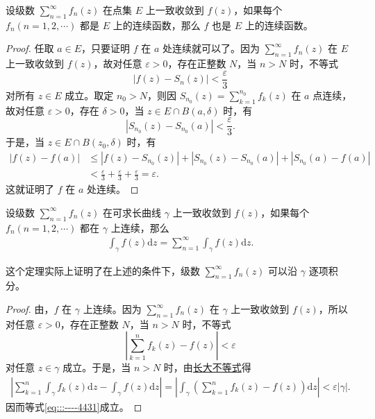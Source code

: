 \documentclass[../../main.tex]{subfiles}
\begin{document}
\begin{theorem}\label{theorem:定理4.1.4}
设级数 \( \sum_{n=1}^{\infty} f_n(z) \) 在点集 \( E \) 上一致收敛到 \( f(z) \)，如果每个 \( f_n (n = 1, 2, \cdots) \) 都是 \( E \) 上的连续函数，那么 \( f \) 也是 \( E \) 上的连续函数。
\end{theorem}
\begin{proof}
任取 \( a \in E \)，只要证明 \( f \) 在 \( a \) 处连续就可以了。因为 \( \sum_{n=1}^{\infty} f_n(z) \) 在 \( E \) 上一致收敛到 \( f(z) \)，故对任意 \( \varepsilon > 0 \)，存在正整数 \( N \)，当 \( n > N \) 时，不等式
\[
|f(z) - S_n(z)| < \frac{\varepsilon}{3}
\]
对所有 \( z \in E \) 成立。取定 \( n_0 > N \)，则因 \( S_{n_0}(z) = \sum_{k=1}^{n_0} f_k(z) \) 在 \( a \) 点连续，故对任意 \( \varepsilon > 0 \)，存在 \( \delta > 0 \)，当 \( z \in E \cap B(a, \delta) \) 时，有
\[
|S_{n_0}(z) - S_{n_0}(a)| < \frac{\varepsilon}{3}.
\]
于是，当 \( z \in E \cap B(z_0, \delta) \) 时，有
\begin{align*}
|f(z) - f(a)| &\leqslant |f(z) - S_{n_0}(z)| + |S_{n_0}(z) - S_{n_0}(a)| + |S_{n_0}(a) - f(a)| \\
&< \frac{\varepsilon}{3} + \frac{\varepsilon}{3} + \frac{\varepsilon}{3}= \varepsilon.
\end{align*}
这就证明了 \( f \) 在 \( a \) 处连续。

\end{proof}

\begin{theorem}\label{theorem:定理4.1.5}
设级数 \( \sum_{n=1}^{\infty} f_n(z) \) 在可求长曲线 \( \gamma \) 上一致收敛到 \( f(z) \)，如果每个 \( f_n (n = 1, 2, \cdots) \) 都在 \( \gamma \) 上连续，那么
\begin{align}
\int_{\gamma} f(z) \mathrm{d}z = \sum_{n=1}^{\infty} \int_{\gamma} f(z) \mathrm{d}z.\label{eq:::----4431}
\end{align}
\end{theorem}
\begin{remark}
这个定理实际上证明了在上述的条件下，级数 \( \sum_{n=1}^{\infty} f_n(z) \) 可以沿 \( \gamma \) 逐项积分。
\end{remark}
\begin{proof}
由，\( f \) 在 \( \gamma \) 上连续。因为 \( \sum_{n=1}^{\infty} f_n(z) \) 在 \( \gamma \) 上一致收敛到 \( f(z) \)，所以对任意 \( \varepsilon > 0 \)，存在正整数 \( N \)，当 \( n > N \) 时，不等式
\[
\left| \sum_{k=1}^{n} f_k(z) - f(z) \right| < \varepsilon
\]
对任意 \( z \in \gamma \) 成立。于是，当 \( n > N \) 时，由\hyperref[proposition:长大不等式]{长大不等式}得
\begin{align*}
\left| \sum_{k=1}^{n} \int_{\gamma} f_k(z) \mathrm{d}z - \int_{\gamma} f(z) \mathrm{d}z \right| = \left| \int_{\gamma} \left( \sum_{k=1}^{n} f_k(z) - f(z) \right) \mathrm{d}z \right| < \varepsilon |\gamma|.
\end{align*}
因而等式\eqref{eq:::----4431}成立。

\end{proof}
\end{document}
